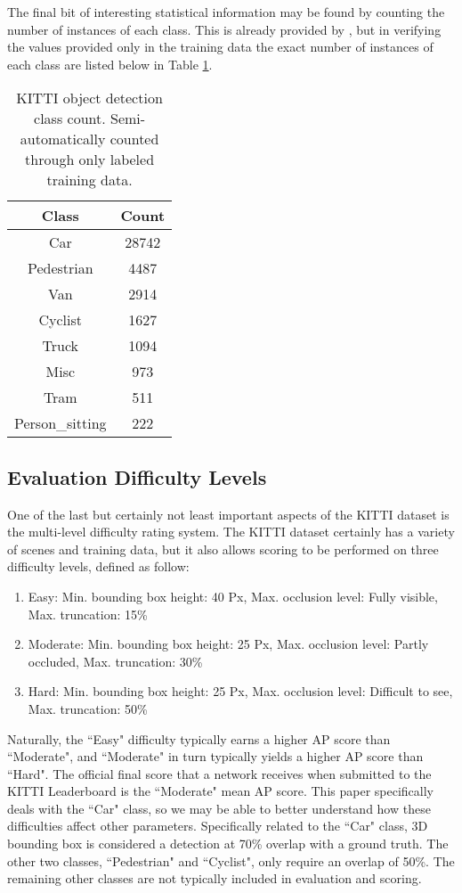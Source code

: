 The final bit of interesting statistical information may be found by counting the number of instances of each class. This is already provided by \cite{geiger_are_2012}, but in verifying the values provided only in the training data the exact number of instances of each class are listed below in Table \ref{kitti_class_stats}.

\begin{table}[ht]
	\centering
	\caption{KITTI object detection class count. Semi-automatically counted through only labeled training data.}
	\begin{tabular}{|c|c|}
		\hline
		\bfseries Class & \bfseries Count\\
		\hline
		Car & 28742 \\
		\hline
		Pedestrian & 4487 \\
		\hline
		Van & 2914 \\
		\hline
		Cyclist & 1627 \\
		\hline
		Truck & 1094 \\
		\hline
		Misc & 973 \\
		\hline
		Tram & 511 \\
		\hline
		Person\_sitting & 222 \\
		\hline
	\end{tabular}
	\label{kitti_class_stats}
\end{table}

\subsection{Evaluation Difficulty Levels}
One of the last but certainly not least important aspects of the KITTI dataset is the multi-level difficulty rating system. The KITTI dataset certainly has a variety of scenes and training data, but it also allows scoring to be performed on three difficulty levels, defined as follow:

\begin{enumerate}\itemsep=-0.5em
	\item Easy: Min. bounding box height: 40 Px, Max. occlusion level: Fully visible, Max. truncation: 15\%
	\item Moderate: Min. bounding box height: 25 Px, Max. occlusion level: Partly occluded, Max. truncation: 30\%
	\item Hard: Min. bounding box height: 25 Px, Max. occlusion level: Difficult to see, Max. truncation: 50\%
\end{enumerate}

Naturally, the ``Easy" difficulty typically earns a higher AP score than ``Moderate", and ``Moderate" in turn typically yields a higher AP score than ``Hard". The official final score that a network receives when submitted to the KITTI Leaderboard is the ``Moderate" mean AP score. This paper specifically deals with the ``Car" class, so we may be able to better understand how these difficulties affect other parameters. Specifically related to the ``Car" class, 3D bounding box is considered a detection at 70\% overlap with a ground truth. The other two classes, ``Pedestrian" and ``Cyclist", only require an overlap of 50\%. The remaining other classes are not typically included in evaluation and scoring.

